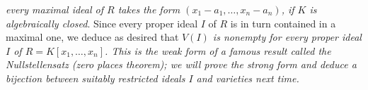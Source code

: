 {\sl every maximal ideal of $R$ takes the form $(x_1-a_1,\ldots,x_n-a_n)$, if $K$ is algebraically closed}.  Since every proper ideal $I$ of $R$ is in turn contained in a maximal one, we deduce as desired that \sl{$V(I)$ is nonempty for every proper ideal $I$ of $R=K[x_1,\ldots,x_n]$}.  This is the weak form of a famous result called the Nullstellensatz (zero places theorem); we will prove the strong form and deduce a bijection between suitably restricted ideals $I$ and varieties next time.